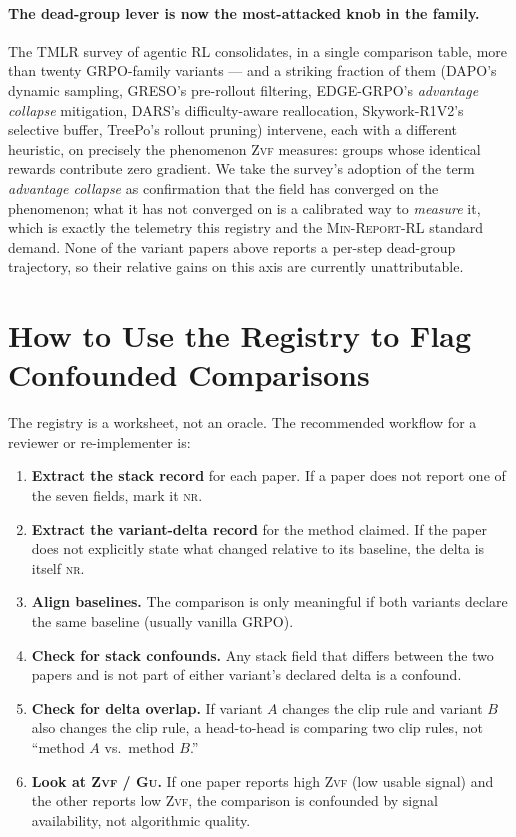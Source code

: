 \documentclass[11pt]{article}
\newcommand{\nr}{\textsc{nr}}
\newcommand{\zvf}{\textsc{Zvf}}
\newcommand{\gu}{\textsc{Gu}}
\newcommand{\minreport}{\textsc{Min-Report-RL}}
\newcommand{\grpo}{\textsc{GRPO}}
\begin{document}
\paragraph{The dead-group lever is now the most-attacked knob in the family.}
The TMLR survey of agentic RL \cite{agenticrlsurvey2026} consolidates, in a single
comparison table, more than twenty \grpo{}-family variants --- and a striking
fraction of them (DAPO's dynamic sampling, GRESO's pre-rollout filtering,
EDGE-\grpo{}'s \emph{advantage collapse} mitigation, DARS's difficulty-aware
reallocation, Skywork-R1V2's selective buffer, TreePo's rollout pruning)
intervene, each with a different heuristic, on precisely the phenomenon
\zvf{} measures: groups whose identical rewards contribute zero gradient.
We take the survey's adoption of the term \emph{advantage collapse} as
confirmation that the field has converged on the phenomenon; what it has not
converged on is a calibrated way to \emph{measure} it, which is exactly the
telemetry this registry and the \minreport{} standard demand. None of the
variant papers above reports a per-step dead-group trajectory, so their
relative gains on this axis are currently unattributable.

\section{How to Use the Registry to Flag Confounded Comparisons}
\label{sec:usage}

The registry is a worksheet, not an oracle. The recommended workflow for a
reviewer or re-implementer is:

\begin{enumerate}[leftmargin=1.6em, itemsep=2pt]
  \item \textbf{Extract the stack record} for each paper. If a paper does not
    report one of the seven fields, mark it \nr{}.
  \item \textbf{Extract the variant-delta record} for the method claimed. If
    the paper does not explicitly state what changed relative to its baseline,
    the delta is itself \nr{}.
  \item \textbf{Align baselines.} The comparison is only meaningful if both
    variants declare the same baseline (usually vanilla \grpo{}).
  \item \textbf{Check for stack confounds.} Any stack field that differs
    between the two papers and is not part of either variant's declared delta
    is a confound.
  \item \textbf{Check for delta overlap.} If variant $A$ changes the clip rule
    and variant $B$ also changes the clip rule, a head-to-head is comparing two
    clip rules, not ``method $A$ vs.\ method $B$.''
  \item \textbf{Look at \zvf{} / \gu{}.} If one paper reports high \zvf{}
    (low usable signal) and the other reports low \zvf{}, the comparison is
    confounded by signal availability, not algorithmic quality.
\end{enumerate}
\end{document}
